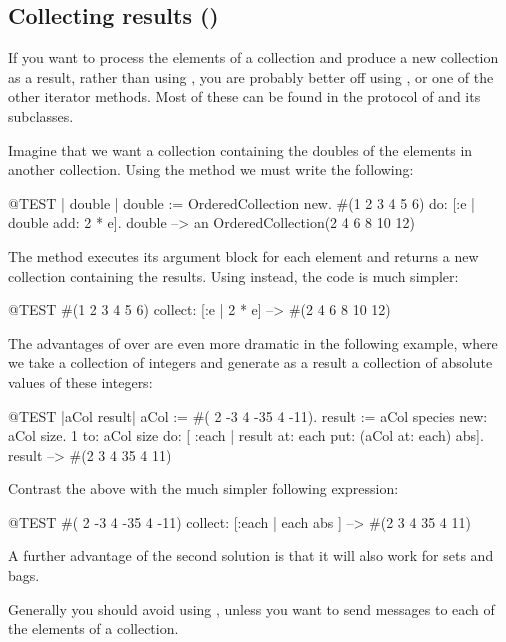 \documentclass[a4paper,10pt,twoside]{book}
\begin{document}
\subsection{Collecting results ()}
If you want to process the elements of a collection and produce a new collection as a result, rather than using , you are probably better off using , or one of the other iterator methods.
Most of these can be found in the  protocol of  and its subclasses.

Imagine that we want a collection containing the doubles of the elements in another collection. Using the method  we must write the following:

\begin{code}{@TEST | double |}
double := OrderedCollection new.
#(1 2 3 4 5 6) do: [:e | double add: 2 * e].
double --> an OrderedCollection(2 4 6 8 10 12)
\end{code}

\noindent
The method  executes its argument block for each element and returns a new collection containing the results. 
Using  instead, the code is much simpler:
\begin{code}{@TEST}
#(1 2 3 4 5 6) collect: [:e | 2 * e] --> #(2 4 6 8 10 12)
\end{code}

The advantages of  over  are even more dramatic in the following example, where we take a collection of integers and generate as a result a collection of absolute values of these integers:

\begin{code}{@TEST |aCol result|}
aCol :=  #( 2 -3 4 -35 4 -11).
result := aCol species new: aCol size.
1 to: aCol size do: [ :each | result at: each put: (aCol at: each) abs].
result --> #(2 3 4 35 4 11)
\end{code}
\noindent
Contrast the above with the much simpler following expression:
\begin{code}{@TEST}
#( 2 -3 4 -35 4 -11) collect: [:each | each abs ] --> #(2 3 4 35 4 11)
\end{code}
\noindent
A further advantage of the second solution is that it will also work for sets and bags.

Generally you should avoid using , unless you want to send messages to each of the elements of a collection.
\end{document}
